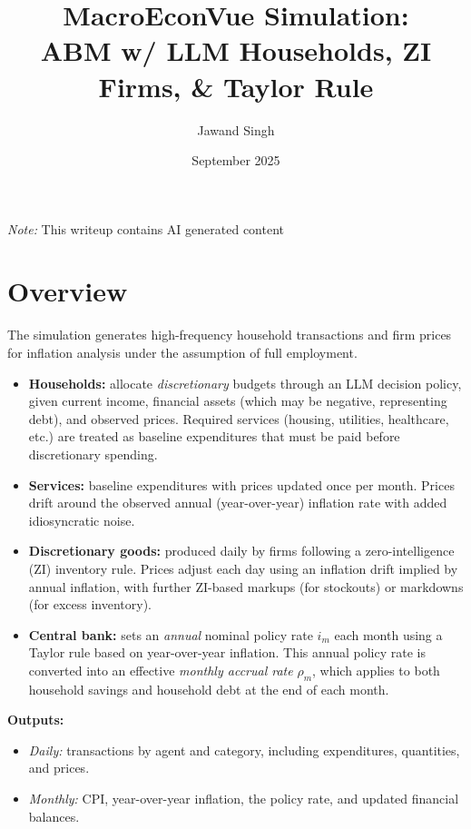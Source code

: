 \documentclass[12pt]{article}
\title{MacroEconVue Simulation: \\ ABM w/ LLM Households, ZI Firms, \& Taylor Rule}
\author{Jawand Singh}
\date{September 2025}
\begin{document}
\maketitle

\emph{Note:} This writeup contains AI generated content

\section{Overview}
The simulation generates high-frequency household transactions and firm prices for inflation analysis under the assumption of full employment. 

\begin{itemize}
    \item \textbf{Households:} allocate \emph{discretionary} budgets through an LLM decision policy, given current income, financial assets (which may be negative, representing debt), and observed prices. Required services (housing, utilities, healthcare, etc.) are treated as baseline expenditures that must be paid before discretionary spending.
    
    \item \textbf{Services:} baseline expenditures with prices updated once per month. Prices drift around the observed annual (year-over-year) inflation rate with added idiosyncratic noise.
    
    \item \textbf{Discretionary goods:} produced daily by firms following a zero-intelligence (ZI) inventory rule. Prices adjust each day using an inflation drift implied by annual inflation, with further ZI-based markups (for stockouts) or markdowns (for excess inventory).
    
    \item \textbf{Central bank:} sets an \emph{annual} nominal policy rate $i_m$ each month using a Taylor rule based on year-over-year inflation. This annual policy rate is converted into an effective \emph{monthly accrual rate} $\rho_m$, which applies to both household savings and household debt at the end of each month.
\end{itemize}

\textbf{Outputs:}  
\begin{itemize}
    \item \emph{Daily:} transactions by agent and category, including expenditures, quantities, and prices.
    \item \emph{Monthly:} CPI, year-over-year inflation, the policy rate, and updated financial balances.
\end{itemize}
\end{document}
